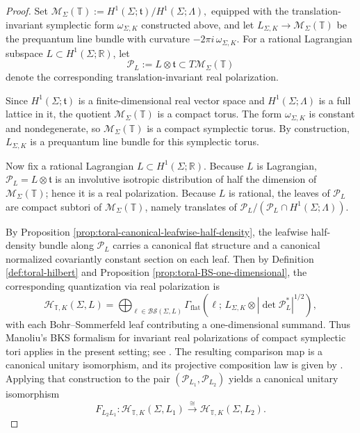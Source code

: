 \documentclass[12pt]{amsart}
\numberwithin{equation}{section}
\begin{document}
\begin{proof}
Set $\mathcal M_\Sigma(\mathbb T)
:=
H^1(\Sigma;\mathfrak t)/H^1(\Sigma;\Lambda),$
equipped with the translation-invariant symplectic form $\omega_{\Sigma,K}$ constructed above,
and let $L_{\Sigma,K}\to\mathcal M_\Sigma(\mathbb T)$
be the prequantum line bundle with curvature $-2\pi i\,\omega_{\Sigma,K}$.
For a rational Lagrangian subspace $L\subset H^1(\Sigma;\mathbb R)$, let
\[
\mathcal P_L:=L\otimes \mathfrak t
\subset T\mathcal M_\Sigma(\mathbb T)
\]
denote the corresponding translation-invariant real polarization.

Since $H^1(\Sigma;\mathfrak t)$ is a finite-dimensional real vector space and
$H^1(\Sigma;\Lambda)$ is a full lattice in it, the quotient
$\mathcal M_\Sigma(\mathbb T)$ is a compact torus. The form $\omega_{\Sigma,K}$ is constant and
nondegenerate, so $\mathcal M_\Sigma(\mathbb T)$ is a compact symplectic torus. By construction,
$L_{\Sigma,K}$ is a prequantum line bundle for this symplectic torus.

Now fix a rational Lagrangian $L\subset H^1(\Sigma;\mathbb R)$. Because $L$ is Lagrangian,
$\mathcal P_L=L\otimes\mathfrak t$ is an involutive isotropic distribution of half the dimension of
$\mathcal M_\Sigma(\mathbb T)$; hence it is a real polarization. Because $L$ is rational, the leaves of
$\mathcal P_L$ are compact subtori of $\mathcal M_\Sigma(\mathbb T)$, namely translates of
$\mathcal P_L/(\mathcal P_L\cap H^1(\Sigma;\Lambda))$.

By Proposition \ref{prop:toral-canonical-leafwise-half-density}, the leafwise half-density bundle along $\mathcal P_L$ carries a canonical flat
structure and a canonical normalized covariantly constant section on each leaf. Then by Definition \ref{def:toral-hilbert} and Proposition \ref{prop:toral-BS-one-dimensional},
the corresponding quantization via real polarization is
\[
\mathcal H_{\mathbb T,K}(\Sigma,L)
=
\bigoplus_{\ell\in \mathcal{BS}(\Sigma,L)}
\Gamma_{\mathrm{flat}}\!\left(
\ell;\,
L_{\Sigma,K}\otimes |\det \mathcal P_L^*|^{1/2}
\right),
\]
with each Bohr--Sommerfeld leaf contributing a one-dimensional summand. Thus Manoliu’s BKS formalism for invariant real polarizations of compact symplectic tori applies in the present setting; see \cite[ Sections II, IV]{Manoliu2}. The resulting comparison map is a canonical unitary isomorphism, and its projective composition law is given by \cite[Theorem VI.4]{Manoliu2}. Applying that construction to the pair $(\mathcal P_{L_1},\mathcal P_{L_2})$
yields a canonical unitary isomorphism
\[
F_{L_2L_1}\colon
\mathcal H_{\mathbb T,K}(\Sigma,L_1)\xrightarrow{\ \cong\ }
\mathcal H_{\mathbb T,K}(\Sigma,L_2).
\]


\end{proof}
\end{document}
